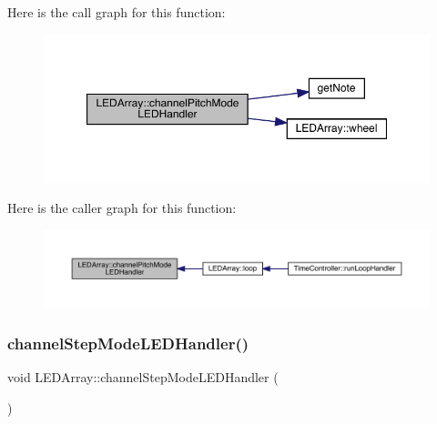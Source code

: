 Here is the call graph for this function\+:
\nopagebreak
\begin{figure}[H]
\begin{center}
\leavevmode
\includegraphics[width=350pt]{class_l_e_d_array_a602c56fdb10d7bf66f8d681081a99b83_cgraph}
\end{center}
\end{figure}
Here is the caller graph for this function\+:
\nopagebreak
\begin{figure}[H]
\begin{center}
\leavevmode
\includegraphics[width=350pt]{class_l_e_d_array_a602c56fdb10d7bf66f8d681081a99b83_icgraph}
\end{center}
\end{figure}
\mbox{\label{class_l_e_d_array_a81dfe62b22624f9f29d57da0298043fc}} 
\subsubsection{\texorpdfstring{channel\+Step\+Mode\+L\+E\+D\+Handler()}{channelStepModeLEDHandler()}}
{\footnotesize\ttfamily void L\+E\+D\+Array\+::channel\+Step\+Mode\+L\+E\+D\+Handler (\begin{DoxyParamCaption}{ }\end{DoxyParamCaption})}

